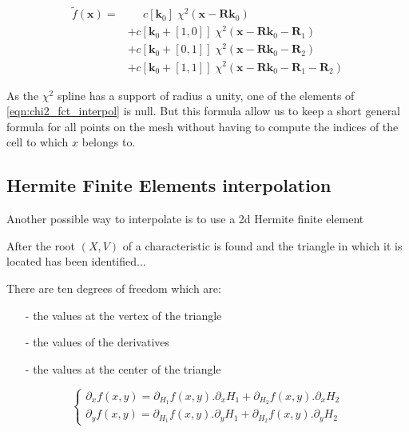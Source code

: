\documentclass[proc]{edpsmath}
\begin{document}
\begin{align}
\label{eqn:chi2_fct_interpol}
\tilde{f}(\mathbf{x}) =& \;\;\;\;\; c[\mathbf{k}_0] \; \chi^2(\mathbf{x} - \mathbf{R}\mathbf{k}_0) \nonumber\\
	&+ c[\mathbf{k}_0 +[1,0]]\; \chi^2(\mathbf{x} - \mathbf{R}\mathbf{k}_0 - \mathbf{R}_1) \nonumber\\
	&+ c[\mathbf{k}_0 +[0,1]]\; \chi^2(\mathbf{x} - \mathbf{R}\mathbf{k}_0 - \mathbf{R}_2) \nonumber\\
	&+ c[\mathbf{k}_0 +[1,1]]\; \chi^2(\mathbf{x} - \mathbf{R}\mathbf{k}_0 - \mathbf{R}_1 - \mathbf{R}_2)
\end{align}

\rmrk  As the $\chi^2$ spline has a support of radius a unity, one of the elements of \eqref{eqn:chi2_fct_interpol} is null. But this formula allow us to keep a short general formula for all points on the mesh without having to compute the indices of the cell to which $x$ belongs to.


\subsection{Hermite Finite Elements interpolation}
Another possible way to interpolate is to use a 2d Hermite finite element \cite{zie}   

After the root $(X,V)$ of a characteristic is found and  the triangle in which it is located has been identified... 

There are ten degrees of freedom which are:
\begin{itemize}
\item[-] the values at the vertex of the triangle 
\item[-] the values of the derivatives 
\item[-] the values at the center of the triangle 
\end{itemize}



\begin{equation}
\begin{cases}  

\partial _x f(x,y) = \partial _{H_1} f(x,y).   \partial _x H_1 +   \partial _{H_2} f(x,y).   \partial _x H_2  \\
\partial _y f(x,y) = \partial _{H_1} f(x,y).   \partial _y H_1 +   \partial _{H_2} f(x,y).   \partial _y H_2             

\end{cases}
\end{equation}
\end{document}
